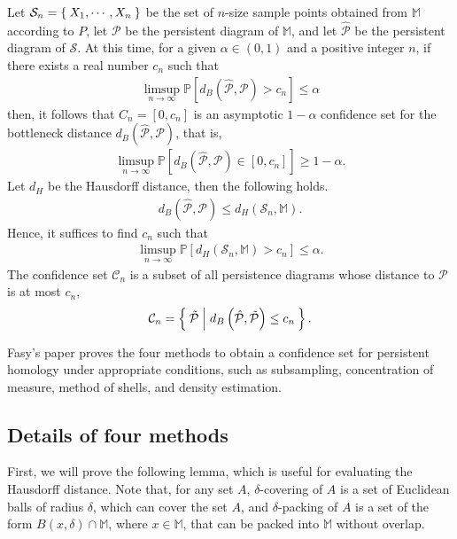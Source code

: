 \documentclass[dvipdfmx,11pt,notheorems]{article}
\begin{document}
Let $\mathcal{S}_n = \Set{X_1, \cdots, X_n}$ be the set of $n$-size sample points obtained from $\mathbb{M}$ according to $P$, let $\mathcal{P}$ be the persistent diagram of $\mathbb{M}$, and let $\hat{\mathcal{P}}$ be the persistent diagram of $\mathcal{S}$. At this time, for a given $\alpha \in \left( 0, 1 \right)$ and a positive integer $n$, if there exists a real number $c_n$ such that
\begin{align*}
  \limsup_{n\to\infty} \mathbb{P} \left[ d_B \left( \hat{\mathcal{P}}, \mathcal{P} \right) > c_n \right] \leq \alpha
\end{align*}
then, it follows that $C_n = \left[ 0, c_n \right]$ is an asymptotic $1 - \alpha$ confidence set for the bottleneck distance $d_B \left( \hat{\mathcal{P}}, \mathcal{P} \right)$, that is,
\begin{align*}
  \limsup_{n\to\infty} \mathbb{P} \left[ d_B \left( \hat{\mathcal{P}}, \mathcal{P} \right) \in \left[ 0, c_n \right] \right] \geq 1 - \alpha.
\end{align*}
Let $d_H$ be the Hausdorff distance, then the following holds.
\begin{align*}
  d_B \left( \hat{\mathcal{P}}, \mathcal{P} \right) \leq d_H\left( \mathcal{S}_n, \mathbb{M} \right).
\end{align*}
Hence, it suffices to find $c_n$ such that
\begin{align*}
  \limsup_{n\to\infty} \mathbb{P} \left[ d_H\left( \mathcal{S}_n, \mathbb{M} \right) > c_n \right] \leq \alpha.
\end{align*}
The confidence set $\mathcal{C}_n$ is a subset of all persistence diagrams whose distance to $\mathcal{P}$ is at most $c_n$,
\begin{align*}
  \mathcal{C}_n = \Set{ \tilde{\mathcal{P}} | d_B \left( \hat{\mathcal{P}}, \tilde{\mathcal{P}} \right) \leq c_n}.
\end{align*}

Fasy's paper \cite{confidence-sets-for-persistence-diagrams} proves the four methods to obtain a confidence set for persistent homology under appropriate conditions, such as subsampling, concentration of measure,  method of shells, and density estimation.

\subsection{Details of four methods}

First, we will prove the following lemma, which is useful for evaluating the Hausdorff distance. Note that, for any set $A$, $\delta$-covering of $A$ is a set of Euclidean balls of radius $\delta$, which can cover the set $A$, and $\delta$-packing of $A$ is a set of the form $B\left( x, \delta \right) \cap \mathbb{M}$, where $x \in \mathbb{M}$, that can be packed into $\mathbb{M}$ without overlap.
\end{document}
